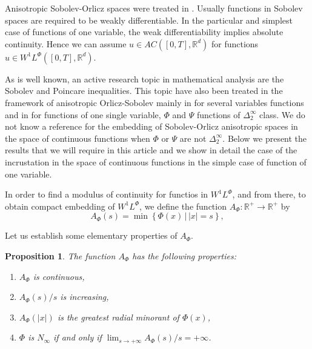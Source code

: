 \documentclass[twoside]{article}
\newtheorem{prop}[thm]{Proposition}
\theoremstyle{remark}
\newcommand{\lphi}{L^{\Phi}}
\newcommand{\ephi}{E^{\Phi}}
\newcommand{\wphi}{W^{1}\lphi}
\newcommand{\wphie}{W^{1}\ephi}
\newcommand{\rr}{\mathbb{R}}
\begin{document}
Anisotropic Sobolev-Orlicz spaces were treated in \cite{cianchi2000fully,cianchi2004optimal,chamra2017anisotropic,trudinger1974imbedding}. Usually functions in Sobolev spaces are required to be weakly differentiable. In the particular and simplest case of functions of one variable, the weak differentiability implies absolute continuity. Hence we can assume $u\in AC\left([0,T],\rr^d\right)$ for functions $u\in\wphi\left([0,T],\rr^d\right)$.
% 
% 


As is well known, an active research topic in mathematical analysis are the Sobolev and Poincare inequalities. This topic have also been treated in the framework of anisotropic Orlicz-Sobolev mainly in \cite{cianchi2000fully,cianchi2004optimal,trudinger1974imbedding} for several variables functions and in \cite{chamra2017anisotropic} for functions of one single variable, $\Phi$ and $\Psi$ functions of $\Delta_2^{\infty}$ class.   We do not know a reference for the embedding of Sobolev-Orlicz anisotropic spaces in the space of continuous functions when $\Phi$ or $\Psi$ are not $\Delta_2^{\infty}$. Below we present the results that we will require in this article and we show in detail the case of the incrustation in the space of continuous functions in the simple case of function of one variable.

In order to find a modulus of continuity for functios in $\wphi$, and from there, to obtain compact embedding of $\wphi$, we define the function $A_{\Phi}:\rr^+\to\rr^+$ by
\begin{equation}\label{eq:inversa-gral}
A_{\Phi}(s)=\min\left\{\Phi(x)\,\big|\,|x|=s\right\},
\end{equation}

Let us establish some elementary properties of $A_{\Phi}$.
\begin{prop}\label{prop:AsubPhi} The function $A_{\Phi}$ has the following properties:
\begin{enumerate}
 \item\label{it:prop1} $A_{\Phi}$ is continuous,
 \item\label{it:prop2} $A_{\Phi}(s)/s$ is increasing,
 \item\label{it:prop3} $A_{\Phi}(|x|)$ is the \emph{greatest radial minorant} of 
 $\Phi(x)$,
 \item\label{it:prop4} $\Phi$ is $N_{\infty}$ if and only if $\lim_{s\to+\infty} A_{\Phi}(s)/s=+\infty$.
\end{enumerate}
\end{prop}
\end{document}

